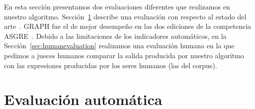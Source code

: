 
%  
En esta secci\'on presentamos dos evaluaciones diferentes que realizamos en nuestro algoritmo. Secci\'on~\ref{sec:automaticevaluation} describe una evaluaci\'on con respecto al estado del arte~\cite{KrahmerGRAPH}. GRAPH fue el de mejor desempe\~no en las dos ediciones de la competencia ASGRE~\cite{gatt-balz-kow:2008:ENLG}. Debido a las limitaciones de los indicadores autom\'aticos, en la Secci\'on~\ref{sec:humanevaluation} realizamos una evaluaci\'on humana en la que pedimos a jueces humanos comparar la salida producida por nuestro algoritmo con las expresiones producidas por los seres humanos (las del corpus).


\section{Evaluaci\'on autom\'atica } \label{sec:automaticevaluation}



